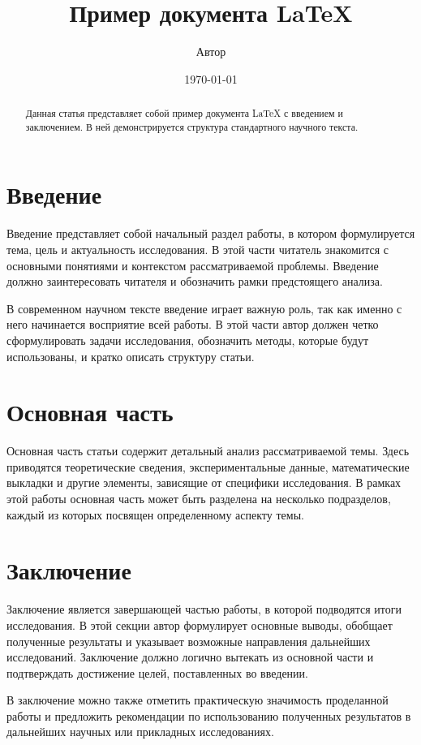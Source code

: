 \documentclass[12pt]{article}
\title{Пример документа LaTeX}
\author{Автор}
\date{\today}
\begin{document}
\maketitle

\begin{abstract}
Данная статья представляет собой пример документа LaTeX с введением и заключением. В ней демонстрируется структура стандартного научного текста.
\end{abstract}

\section{Введение}
Введение представляет собой начальный раздел работы, в котором формулируется тема, цель и актуальность исследования. В этой части читатель знакомится с основными понятиями и контекстом рассматриваемой проблемы. Введение должно заинтересовать читателя и обозначить рамки предстоящего анализа.

В современном научном тексте введение играет важную роль, так как именно с него начинается восприятие всей работы. В этой части автор должен четко сформулировать задачи исследования, обозначить методы, которые будут использованы, и кратко описать структуру статьи.

\section{Основная часть}
Основная часть статьи содержит детальный анализ рассматриваемой темы. Здесь приводятся теоретические сведения, экспериментальные данные, математические выкладки и другие элементы, зависящие от специфики исследования. В рамках этой работы основная часть может быть разделена на несколько подразделов, каждый из которых посвящен определенному аспекту темы.

\section{Заключение}
Заключение является завершающей частью работы, в которой подводятся итоги исследования. В этой секции автор формулирует основные выводы, обобщает полученные результаты и указывает возможные направления дальнейших исследований. Заключение должно логично вытекать из основной части и подтверждать достижение целей, поставленных во введении.

В заключение можно также отметить практическую значимость проделанной работы и предложить рекомендации по использованию полученных результатов в дальнейших научных или прикладных исследованиях.
\end{document}
